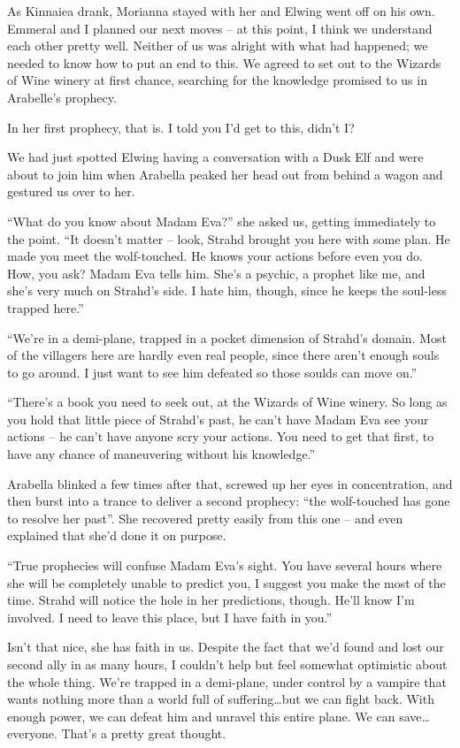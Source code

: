 As Kinnaiea drank, Morianna stayed with her and Elwing went off on his own. Emmeral and I planned our next moves -- at this point, I think we understand each other pretty well. Neither of us was alright with what had happened; we needed to know how to put an end to this. We agreed to set out to the Wizards of Wine winery at first chance, searching for the knowledge promised to us in Arabelle's prophecy.

In her first prophecy, that is. I told you I'd get to this, didn't I?

We had just spotted Elwing having a conversation with a Dusk Elf and were about to join him when Arabella peaked her head out from behind a wagon and gestured us over to her.

``What do you know about Madam Eva?'' she asked us, getting immediately to the point. ``It doesn't matter -- look, Strahd brought you here with some plan. He made you meet the wolf-touched. He knows your actions before even you do. How, you ask? Madam Eva tells him. She's a psychic, a prophet like me, and she's very much on Strahd's side. I hate him, though, since he keeps the soul-less trapped here.''

``We're in a demi-plane, trapped in a pocket dimension of Strahd's domain. Most of the villagers here are hardly even real people, since there aren't enough souls to go around. I just want to see him defeated so those soulds can move on.''

``There's a book you need to seek out, at the Wizards of Wine winery. So long as you hold that little piece of Strahd's past, he can't have Madam Eva see your actions -- he can't have anyone scry your actions. You need to get that first, to have any chance of maneuvering without his knowledge.''

Arabella blinked a few times after that, screwed up her eyes in concentration, and then burst into a trance to deliver a second prophecy: ``the wolf-touched has gone to resolve her past''. She recovered pretty easily from this one -- and even explained that she'd done it on purpose.

``True prophecies will confuse Madam Eva's sight. You have several hours where she will be completely unable to predict you, I suggest you make the most of the time. Strahd will notice the hole in her predictions, though. He'll know I'm involved. I need to leave this place, but I have faith in you.''

Isn't that nice, she has faith in us. Despite the fact that we'd found and lost our second ally in as many hours, I couldn't help  but feel somewhat optimistic about the whole thing. We're trapped in a demi-plane, under control by a vampire that wants nothing more than a world full of suffering\dots but we can fight back. With enough power, we can defeat him and unravel this entire plane. We can save\dots everyone. That's a pretty great thought.

